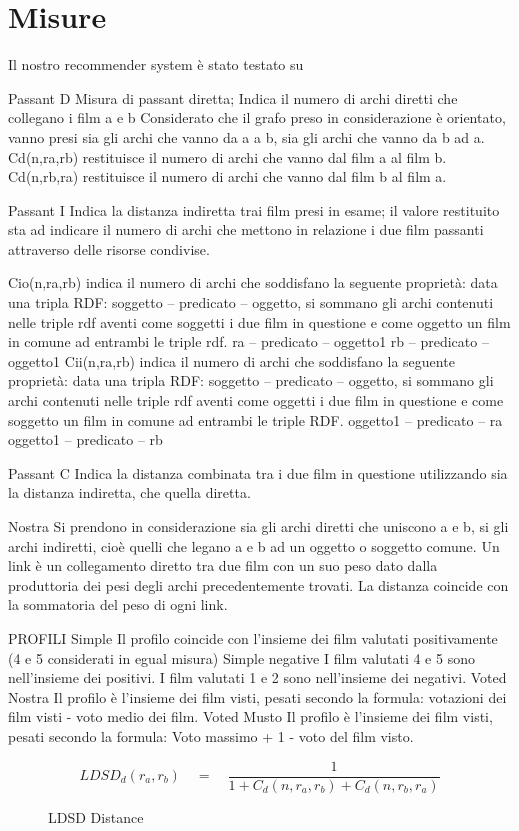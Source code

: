 \section{Misure}
Il nostro recommender system è stato testato su 

Passant D 
Misura di passant diretta; Indica il numero di archi diretti che collegano i film a e b
Considerato che il grafo preso in considerazione è orientato, vanno presi sia gli archi che vanno da a a b, sia gli archi che vanno da b ad a.
Cd(n,ra,rb) restituisce il numero di archi che vanno dal film a al film b. 
Cd(n,rb,ra) restituisce il numero di archi che vanno dal film b al film a.

Passant I 
Indica la distanza indiretta trai film presi in esame; il valore restituito sta ad indicare il numero di archi che mettono in relazione i due film passanti attraverso delle risorse condivise.

Cio(n,ra,rb) indica il numero di archi che soddisfano la seguente proprietà:
data una tripla RDF: soggetto – predicato – oggetto, si sommano gli archi contenuti nelle triple rdf aventi come soggetti i due film in questione e come oggetto un film in comune ad entrambi le triple rdf.
ra – predicato – oggetto1
rb – predicato – oggetto1
Cii(n,ra,rb) indica il numero di archi che soddisfano la seguente proprietà:
data una tripla RDF: soggetto – predicato – oggetto, si sommano gli archi contenuti nelle triple rdf aventi come oggetti i due film in questione e come soggetto un film in comune ad entrambi le triple RDF.
oggetto1 – predicato – ra
oggetto1 – predicato – rb

Passant C
Indica la distanza combinata tra i due film in questione utilizzando sia la distanza indiretta, che quella diretta.

Nostra
Si prendono in considerazione sia gli archi diretti che uniscono a e b, si gli archi indiretti, cioè quelli che legano a e b ad un oggetto o soggetto comune.
Un link è un collegamento diretto tra due film con un suo peso dato dalla produttoria dei pesi degli archi precedentemente trovati.
La distanza coincide con la sommatoria del peso di ogni link.

PROFILI
Simple
Il profilo coincide con l'insieme dei film valutati positivamente (4 e 5 considerati in egual misura)
Simple negative
I film valutati 4 e 5 sono nell'insieme dei positivi. I film valutati 1 e 2 sono nell'insieme dei negativi.
Voted Nostra 
Il profilo è l'insieme dei film visti, pesati secondo la formula:
votazioni dei film visti - voto medio dei film.
Voted Musto 
Il profilo è l'insieme dei film visti, pesati secondo la formula:
Voto massimo + 1 - voto del film visto. 



\begin{figure}[htbp]
  \centering
    \label{LDSD}
    \begin{equation}
        LDSD_{d}(r_{a},r_{b}) \quad = \quad \frac{1} {1+C_{d}(n,r_{a},r_{b})+C_{d}(n,r_{b},r_{a})}
    \end{equation}
      \caption{LDSD Distance}
      \label{LDSD1}
\end{figure}
